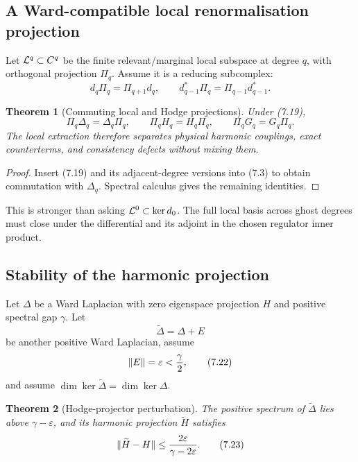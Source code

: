 \documentclass[11pt]{article}
\newtheorem{theorem}{Theorem}[section]
\theoremstyle{remark}
\begin{document}
\subsection{A Ward-compatible local renormalisation projection}

Let \({\cal L}^q\subset C^q\) be the finite relevant/marginal local
subspace at degree \(q\), with orthogonal projection \(\Pi_q\).
Assume it is a reducing subcomplex:
\[
 d_q\Pi_q=\Pi_{q+1}d_q,\qquad
 d_{q-1}^*\Pi_q=\Pi_{q-1}d_{q-1}^*.                         \tag{7.19}
\]

\begin{theorem}[Commuting local and Hodge projections]
\label{thm:v12v7-local}
Under (7.19),
\[
 \Pi_q\Delta_q=\Delta_q\Pi_q,\qquad
 \Pi_qH_q=H_q\Pi_q,\qquad
 \Pi_qG_q=G_q\Pi_q.                                        \tag{7.20}
\]
The local extraction therefore separates physical harmonic
couplings, exact counterterms, and consistency defects without mixing
them.
\end{theorem}

\begin{proof}
Insert (7.19) and its adjacent-degree versions into (7.3) to obtain
commutation with \(\Delta_q\).  Spectral calculus gives the remaining
identities.
\end{proof}

This is stronger than asking \({\cal L}^0\subset\ker d_0\).
The full local basis across ghost degrees must close under the
differential and its adjoint in the chosen regulator inner product.

\subsection{Stability of the harmonic projection}

Let \(\Delta\) be a Ward Laplacian with zero eigenspace projection
\(H\) and positive spectral gap \(\gamma\).  Let
\[
                              \widetilde\Delta=\Delta+E      \tag{7.21}
\]
be another positive Ward Laplacian, assume
\[
                              \|E\|=\varepsilon<{\gamma\over2},\tag{7.22}
\]
and assume \(\dim\ker\widetilde\Delta=\dim\ker\Delta\).

\begin{theorem}[Hodge-projector perturbation]
\label{thm:v12v7-perturb}
The positive spectrum of \(\widetilde\Delta\) lies above
\(\gamma-\varepsilon\), and its harmonic projection
\(\widetilde H\) satisfies
\[
                              \|\widetilde H-H\|
                              \le{2\varepsilon\over\gamma-2\varepsilon}.
                                                                    \tag{7.23}
\]
\end{theorem}
\end{document}
